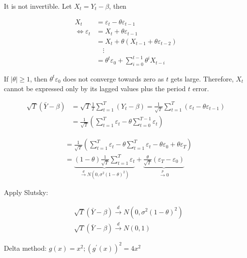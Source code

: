 {{\begin{enumerate}[label=(\alph*)]
{\item 
It is not invertible. Let $X_{t}=Y_{t}-\beta$, then

$$
\begin{aligned}
X_{t} & =\varepsilon_{t}-\theta \varepsilon_{t-1} \\
\Leftrightarrow \varepsilon_{t} & =X_{t}+\theta \varepsilon_{t-1} \\
& =X_{t}+\theta\left(X_{t-1}+\theta \varepsilon_{t-2}\right) \\
& \quad \vdots \\
& =\theta^{t} \varepsilon_{0}+\sum_{i=0}^{t-1} \theta^{i} X_{t-i}
\end{aligned}
$$

If $|\theta| \geq 1$, then $\theta^{t} \varepsilon_{0}$ does not converge towards zero as $t$ gets large. Therefore, $X_{t}$ cannot be expressed only by its lagged values plus the period $t$ error.
}
{\item 
$$
\begin{aligned}
\sqrt{T}(\bar{Y}-\beta) & =\sqrt{T} \frac{1}{T} \sum_{t=1}^{T}\left(Y_{t}-\beta\right)=\frac{1}{\sqrt{T}} \sum_{t=1}^{T}\left(\varepsilon_{t}-\theta \varepsilon_{t-1}\right) \\
& =\frac{1}{\sqrt{T}}\left(\sum_{t=1}^{T} \varepsilon_{t}-\theta \sum_{t=0}^{T-1} \varepsilon_{t}\right)
\end{aligned}
$$

$$
\begin{aligned}
& =\frac{1}{\sqrt{T}}\left(\sum_{t=1}^{T} \varepsilon_{t}-\theta \sum_{t=1}^{T} \varepsilon_{t}-\theta \varepsilon_{0}+\theta \varepsilon_{T}\right) \\
& =\underbrace{(1-\theta) \frac{1}{\sqrt{T}} \sum_{t=1}^{T} \varepsilon_{t}}_{\xrightarrow{d} N(0,\sigma^2(1-\theta)^2)}+\underbrace{\frac{\theta}{\sqrt{T}}\left(\varepsilon_{T}-\varepsilon_{0}\right)}_{\xrightarrow{p}0}
\end{aligned}
$$

Apply Slutsky:

$$
\begin{aligned}
& \sqrt{T}(\bar{Y}-\beta) \xrightarrow{d} N\left(0, \sigma^{2}(1-\theta)^{2}\right) \\
& \sqrt{T}(\bar{Y}-\beta) \xrightarrow{d} N(0,1)
\end{aligned}
$$
}
{\item 
Delta method: $g(x)=x^{2} ;\left(g^{\prime}(x)\right)^{2}=4 x^{2}$

}
\end{enumerate}}}
